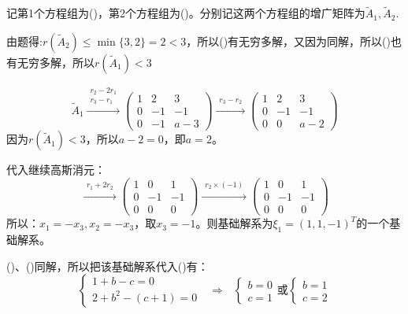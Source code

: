 \documentclass[a4paper]{report}
\begin{document}
\begin{jie}
记第1个方程组为(\uppercase\expandafter{})，第2个方程组为(\uppercase\expandafter{})。分别记这两个方程组的增广矩阵为$\widetilde{A}_1,\widetilde{A}_2$.

由题得:$r(\widetilde{A}_2)\leq\min\{3,2\}=2<3$，所以(\uppercase\expandafter{})有无穷多解，又因为同解，所以(\uppercase\expandafter{})也有无穷多解，所以$r(\widetilde{A}_1)<3$

\begin{equation*}
\widetilde{A}_1\xrightarrow{\substack{r_2-2r_1\\ r_3-r_1}}
{\begin{pmatrix}
1&2&3\\
0&-1&-1\\
0&-1&a-3\end{pmatrix}
}\xrightarrow{\substack{r_3-r_2}}
{\begin{pmatrix}
1&2&3\\
0&-1&-1\\
0&0&a-2\end{pmatrix}
}
\end{equation*}
因为$r(\widetilde{A}_1)<3$，所以$a-2=0$，即$a=2$。

代入继续高斯消元：
\begin{equation*}
\xrightarrow{\substack{r_1+2r_2}}
{
\begin{pmatrix}
1&0&1\\
0&-1&-1\\
0&0&0
\end{pmatrix}
}\xrightarrow{\substack{r_2\times(-1)}}
{
\begin{pmatrix}
1&0&1\\
0&-1&-1\\
0&0&0
\end{pmatrix}
}
\end{equation*}
所以：$x_1=-x_3,x_2=-x_3$，取$x_3=-1$。则基础解系为$\xi_1=(1,1,-1)^T$的一个基础解系。

(\uppercase\expandafter{})、(\uppercase\expandafter{})同解，所以把该基础解系代入(\uppercase\expandafter{})有：
\begin{equation*}
\begin{cases}
1+b-c=0\\
2+b^2-(c+1)=0
\end{cases}~~~\Rightarrow~~~
\begin{cases}
b=0\\
c=1
\end{cases}\text{或}
\begin{cases}
b=1\\
c=2
\end{cases}
\end{equation*}


\end{jie}
\end{document}
